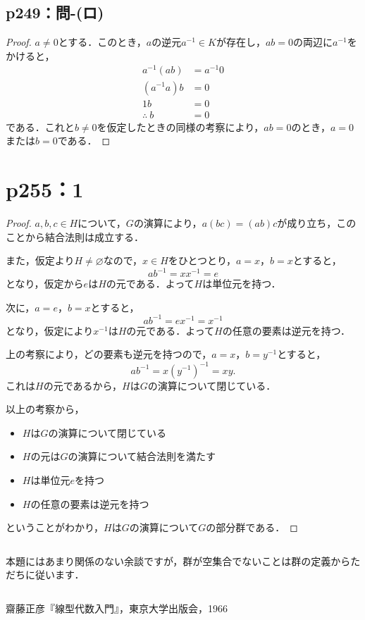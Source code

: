 \documentclass[a4paper,10pt,fleqn]{ltjsarticle}
\begin{document}
\subsection*{p249：問-(ロ)}
\begin{tleftbar}
    \begin{proof}
        $a \ne 0$とする．このとき，$a$の逆元$a^{-1} \in K$が存在し，$ab=0$の両辺に$a^{-1}$をかけると，
        \begin{align*}
            a^{-1} (ab)   & = a^{-1} 0 \\
            (a^{-1}a)b    & =0         \\
            1b            & =0         \\
            \therefore~ b & =0
        \end{align*}
        である．これと$b \ne 0$を仮定したときの同様の考察により，$ab=0$のとき，$a=0$または$b=0$である．
    \end{proof}
\end{tleftbar}

\newpage

\section*{p255：1}
\begin{tleftbar}
    \begin{proof}
        $a,b,c \in H$について，$G$の演算により，$a(bc)=(ab)c$が成り立ち，このことから結合法則は成立する．

        また，仮定より$H \ne \varnothing $なので，$x \in H$をひとつとり，$a=x$，$b=x$とすると，
        \[
            ab^{-1} = x x^{-1}=e
        \]
        となり，仮定から$e$は$H$の元である．よって$H$は単位元を持つ．

        次に，$ a=e$，$b=x$とすると，
        \[
            ab^{-1}=ex^{-1}=x^{-1}
        \]
        となり，仮定により$x^{-1}$は$H$の元である．よって$H$の任意の要素は逆元を持つ．

        上の考察により，どの要素も逆元を持つので，$a=x$，$b=y^{-1}$とすると，
        \[
            ab^{-1}=x(y^{-1})^{-1} = xy.
        \]
        これは$H$の元であるから，$H$は$G$の演算について閉じている．

        以上の考察から，
        \begin{itemize}
            \item $H$は$G$の演算について閉じている
            \item $H$の元は$G$の演算について結合法則を満たす
            \item $H$は単位元$e$を持つ
            \item $H$の任意の要素は逆元を持つ
        \end{itemize}
        ということがわかり，$H$は$G$の演算について$G$の部分群である．
    \end{proof}
\end{tleftbar}

\begin{column}
    本題にはあまり関係のない余談ですが，群が空集合でないことは群の定義からただちに従います．
\end{column}

\newpage
\begin{thebibliography}{9}
     齋藤正彦『線型代数入門』，東京大学出版会，1966
\end{thebibliography}
\end{document}
